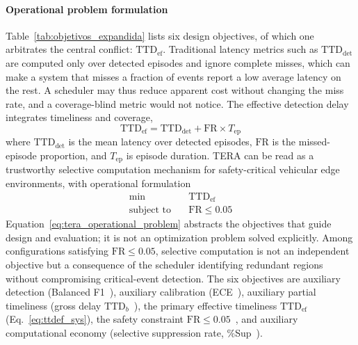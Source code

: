 \documentclass[a4paper,fleqn]{cas-dc}
\begin{document}
\paragraph{Operational problem formulation}
Table~\ref{tab:objetivos_expandida} lists six design objectives, of which one
arbitrates the central conflict: $\mathrm{TTD}_{\mathrm{ef}}$. Traditional
latency metrics such as $\mathrm{TTD}_{\mathrm{det}}$ are computed only over
detected episodes and ignore complete misses, which can make a system that
misses a fraction of events report a low average latency on the rest. A
scheduler may thus reduce apparent cost without changing the miss rate, and a
coverage-blind metric would not notice. The effective detection delay
integrates timeliness and coverage,
\begin{equation}
\mathrm{TTD}_{\mathrm{ef}}
=
\mathrm{TTD}_{\mathrm{det}}
+
\mathrm{FR}\times T_{\mathrm{ep}}
\label{eq:ttdef_sys}
\end{equation}
where $\mathrm{TTD}_{\mathrm{det}}$ is the mean latency over detected episodes,
$\mathrm{FR}$ is the missed-episode proportion, and $T_{\mathrm{ep}}$ is episode
duration. TERA can be read as a trustworthy selective computation mechanism for
safety-critical vehicular edge environments, with operational formulation
\begin{equation}
\begin{aligned}
\min \quad &
\mathrm{TTD}_{\mathrm{ef}} \\
\text{subject to} \quad &
\mathrm{FR} \le 0.05
\end{aligned}
\label{eq:tera_operational_problem}
\end{equation}
Equation~\ref{eq:tera_operational_problem} abstracts the objectives that guide
design and evaluation; it is not an optimization problem solved explicitly.
Among configurations satisfying $\mathrm{FR}\le0.05$, selective computation is
not an independent objective but a consequence of the scheduler identifying
redundant regions without compromising critical-event detection. The six
objectives are auxiliary detection (Balanced F1~\cite{chinchor1992muc}),
auxiliary calibration (ECE~\cite{guo2017calibration}), auxiliary partial
timeliness (gross delay $\mathrm{TTD}_b$~\cite{fawcett1999activity}), the
primary effective timeliness $\mathrm{TTD}_{\mathrm{ef}}$ (Eq.~\ref{eq:ttdef_sys}),
the safety constraint $\mathrm{FR}\le0.05$~\cite{iso26262}, and auxiliary
computational economy (selective suppression rate,
\%Sup~\cite{campos2018skip}).
\end{document}
